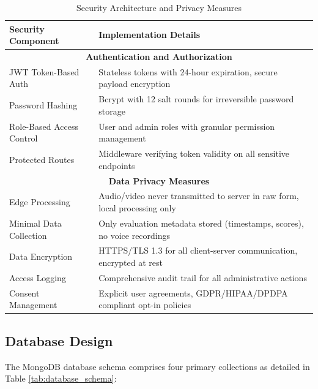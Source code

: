 \documentclass[12pt,a4paper]{article}
\begin{document}
\begin{table}[H]
\centering
\caption{Security Architecture and Privacy Measures}
\label{tab:security}
\small
\begin{tabular}{p{4.5cm}p{9cm}}
\toprule
\textbf{Security Component} & \textbf{Implementation Details} \\
\midrule
\multicolumn{2}{c}{\textbf{Authentication and Authorization}} \\
\midrule
JWT Token-Based Auth & Stateless tokens with 24-hour expiration, secure payload encryption \\
Password Hashing & Bcrypt with 12 salt rounds for irreversible password storage \\
Role-Based Access Control & User and admin roles with granular permission management \\
Protected Routes & Middleware verifying token validity on all sensitive endpoints \\
\midrule
\multicolumn{2}{c}{\textbf{Data Privacy Measures}} \\
\midrule
Edge Processing & Audio/video never transmitted to server in raw form, local processing only \\
Minimal Data Collection & Only evaluation metadata stored (timestamps, scores), no voice recordings \\
Data Encryption & HTTPS/TLS 1.3 for all client-server communication, encrypted at rest \\
Access Logging & Comprehensive audit trail for all administrative actions \\
Consent Management & Explicit user agreements, GDPR/HIPAA/DPDPA compliant opt-in policies \\
\bottomrule
\end{tabular}
\end{table}

\subsection{Database Design}

The MongoDB database schema comprises four primary collections as detailed in Table \ref{tab:database_schema}:
\end{document}
